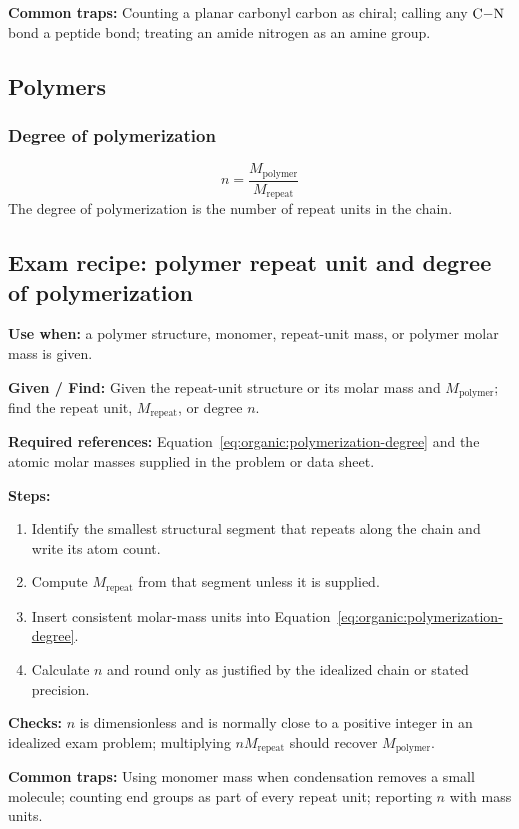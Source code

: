 \textbf{Common traps:} Counting a planar carbonyl carbon as chiral; calling any \(\ce{C-N}\) bond a peptide bond; treating an amide nitrogen as an amine group.

\subsection{Polymers}

\subsubsection{Degree of polymerization}
\begin{equation}
\label{eq:organic:polymerization-degree}
n=\frac{M_{\mathrm{polymer}}}{M_{\mathrm{repeat}}}
\end{equation}
The degree of polymerization is the number of repeat units in the chain.

\subsection{Exam recipe: polymer repeat unit and degree of polymerization}
\textbf{Use when:} a polymer structure, monomer, repeat-unit mass, or polymer molar mass is given.

\textbf{Given / Find:} Given the repeat-unit structure or its molar mass and \(M_{\mathrm{polymer}}\); find the repeat unit, \(M_{\mathrm{repeat}}\), or degree \(n\).

\textbf{Required references:} Equation~\eqref{eq:organic:polymerization-degree} and the atomic molar masses supplied in the problem or data sheet.


\textbf{Steps:}
\begin{enumerate}
    \item Identify the smallest structural segment that repeats along the chain and write its atom count.
    \item Compute \(M_{\mathrm{repeat}}\) from that segment unless it is supplied.
    \item Insert consistent molar-mass units into Equation~\eqref{eq:organic:polymerization-degree}.
    \item Calculate \(n\) and round only as justified by the idealized chain or stated precision.
\end{enumerate}

\textbf{Checks:} \(n\) is dimensionless and is normally close to a positive integer in an idealized exam problem; multiplying \(nM_{\mathrm{repeat}}\) should recover \(M_{\mathrm{polymer}}\).

\textbf{Common traps:} Using monomer mass when condensation removes a small molecule; counting end groups as part of every repeat unit; reporting \(n\) with mass units.
